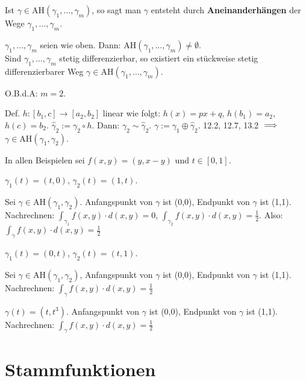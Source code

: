 \documentclass[a4paper,twoside,DIV15,BCOR12mm,chapterprefix=true,headings=twolinechapter]{scrbook}
\begin{document}
Ist $\gamma\in \text{AH}(\gamma_1,\ldots,\gamma_m)$, so sagt man $\gamma$ entsteht durch \textbf{Aneinanderhängen} der Wege $\gamma_1,\ldots,\gamma_m$.

\begin{satz}
$\gamma_1,\ldots,\gamma_m$ seien wie oben. Dann: $\text{AH}(\gamma_1,\ldots,\gamma_m) \ne \emptyset$. \\
Sind $\gamma_1,\ldots,\gamma_m$ stetig differenzierbar, so existiert ein stückweise stetig differenzierbarer Weg $\gamma\in \text{AH}(\gamma_1,\ldots,\gamma_m)$.
\end{satz}

\begin{beweis}
O.B.d.A: $m=2$.

Def. $h:[b_1,c] \to [a_2,b_2]$ linear wie folgt: $h(x)=px+q$, $h(b_1)=a_2$, $h(c)=b_2$. $\hat\gamma_2 := \gamma_2\circ h$. Dann: $\gamma_2\sim \hat\gamma_2$. $\gamma := \gamma_1\oplus\hat\gamma_2$. 12.2, 12.7, 13.2 $\implies$ $\gamma\in \text{AH}(\gamma_1,\gamma_2)$.
\end{beweis}

\begin{beispiel}
In allen Beispielen sei $f(x,y)=(y,x-y)$ und $t\in[0,1]$.
\begin{liste}
\item $\gamma_1(t)=(t,0)$, $\gamma_2(t)=(1,t)$.

Sei $\gamma \in \text{AH}(\gamma_1,\gamma_2)$. Anfangspunkt von $\gamma$ ist (0,0), Endpunkt von $\gamma$ ist (1,1). Nachrechnen: $\int_{\gamma_1}f(x,y)\cdot d(x,y) = 0$, $\int_{\gamma_2}f(x,y)\cdot d(x,y) = \frac{1}{2}$. Also: $\int_\gamma f(x,y) \cdot d(x,y) = \frac{1}{2}$

\item $\gamma_1(t) = (0,t)$, $\gamma_2(t)=(t,1)$.

Sei $\gamma\in \text{AH}(\gamma_1,\gamma_2)$, Anfangspunkt von $\gamma$ ist (0,0), Endpunkt von $\gamma$ ist (1,1). Nachrechnen: $\int_{\gamma}f(x,y)\cdot d(x,y) = \frac{1}{2}$

\item $\gamma(t)=(t,t^3)$. Anfangspunkt von $\gamma$ ist (0,0), Endpunkt von $\gamma$ ist (1,1). Nachrechnen: $\int_\gamma f(x,y)\cdot d(x,y) = \frac{1}{2}$
\end{liste}
\end{beispiel}

\chapter{Stammfunktionen}
\end{document}
